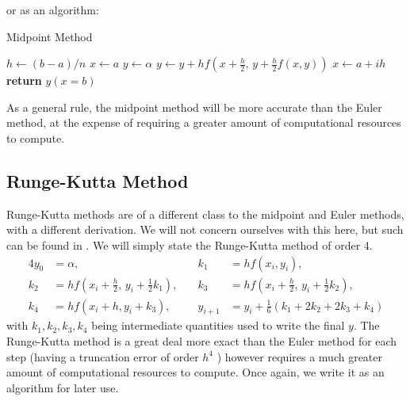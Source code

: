 \documentclass[a4paper,11pt]{report}
\begin{document}
or as an algorithm:

\begin{algorithm}
\caption{Midpoint Method}\label{midpoint-alg}
\begin{algorithmic}[1]
	\State $h \gets (b-a)/n$
	\State $x \gets a$ 
	\State $y \gets \alpha$ 
		\State $y \gets y + h f\left(x + \frac{h}{2}, \,y + \frac{h}{2} f(x,y) \right)$ 
		\State $x \gets a + ih$ 
	\EndFor
	\State \textbf{return} $y(x=b)$ 
	\EndProcedure
\end{algorithmic}
\end{algorithm}

As a general rule, the midpoint method will be more accurate than the Euler method, at the expense of requiring a greater amount of computational resources to compute. 

\subsection{Runge-Kutta Method}

Runge-Kutta methods are of a different class to the midpoint and Euler methods, with a different derivation. We will not concern ourselves with this here, but such can be found in \cite{burden,griffiths2010numerical}. We will simply state the Runge-Kutta method of order 4.
\begin{alignat}{4} \label{runge-def}
	y_{0} &= \alpha, &\quad k_1 &= h f(x_i, y_i), \nonumber \\ 
	k_2 &= h f\left(x_i + \frac{h}{2}, \, y_i + \frac{1}{2} k_1\right), &\quad k_3 &= h f\left(x_i + \frac{h}{2}, \, y_i + \frac{1}{2} k_2 \right), \\
	k_4 &= h f(x_i + h, y_i + k_3), &\quad y_{i+1} &= y_i + \frac{1}{6} \left(k_1 + 2k_2 + 2k_3 + k_4\right) \nonumber
\end{alignat}
with $k_1, k_2, k_3, k_4$ being intermediate quantities used to write the final $y$. The Runge-Kutta method is a great deal more exact than the Euler method for each step (having a truncation error of order $h^4$ \cite{burden}) however requires a much greater amount of computational resources to compute. Once again, we write it as an algorithm for later use.
\end{document}

